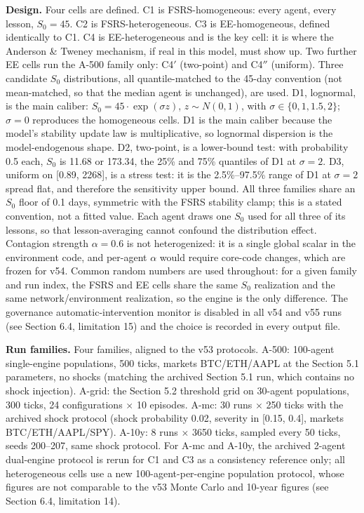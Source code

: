 \documentclass[11pt]{article}
\begin{document}
\textbf{Design.} Four cells are defined. C1 is FSRS-homogeneous: every agent, every lesson, $S_0 = 45$. C2 is FSRS-heterogeneous. C3 is EE-homogeneous, defined identically to C1. C4 is EE-heterogeneous and is the key cell: it is where the Anderson \& Tweney mechanism, if real in this model, must show up. Two further EE cells run the A-500 family only: C4$'$ (two-point) and C4$''$ (uniform). Three candidate $S_0$ distributions, all quantile-matched to the 45-day convention (not mean-matched, so that the median agent is unchanged), are used. D1, lognormal, is the main caliber: $S_0 = 45 \cdot \exp(\sigma z)$, $z \sim N(0,1)$, with $\sigma \in \{0, 1, 1.5, 2\}$; $\sigma = 0$ reproduces the homogeneous cells. D1 is the main caliber because the model's stability update law is multiplicative, so lognormal dispersion is the model-endogenous shape. D2, two-point, is a lower-bound test: with probability 0.5 each, $S_0$ is 11.68 or 173.34, the 25\% and 75\% quantiles of D1 at $\sigma = 2$. D3, uniform on [0.89, 2268], is a stress test: it is the 2.5\%--97.5\% range of D1 at $\sigma = 2$ spread flat, and therefore the sensitivity upper bound. All three families share an $S_0$ floor of 0.1 days, symmetric with the FSRS stability clamp; this is a stated convention, not a fitted value. Each agent draws one $S_0$ used for all three of its lessons, so that lesson-averaging cannot confound the distribution effect. Contagion strength $\alpha = 0.6$ is not heterogenized: it is a single global scalar in the environment code, and per-agent $\alpha$ would require core-code changes, which are frozen for v54. Common random numbers are used throughout: for a given family and run index, the FSRS and EE cells share the same $S_0$ realization and the same network/environment realization, so the engine is the only difference. The governance automatic-intervention monitor is disabled in all v54 and v55 runs (see Section 6.4, limitation 15) and the choice is recorded in every output file.

\textbf{Run families.} Four families, aligned to the v53 protocols. A-500: 100-agent single-engine populations, 500 ticks, markets BTC/ETH/AAPL at the Section 5.1 parameters, no shocks (matching the archived Section 5.1 run, which contains no shock injection). A-grid: the Section 5.2 threshold grid on 30-agent populations, 300 ticks, 24 configurations $\times$ 10 episodes. A-mc: 30 runs $\times$ 250 ticks with the archived shock protocol (shock probability 0.02, severity in [0.15, 0.4], markets BTC/ETH/AAPL/SPY). A-10y: 8 runs $\times$ 3650 ticks, sampled every 50 ticks, seeds 200--207, same shock protocol. For A-mc and A-10y, the archived 2-agent dual-engine protocol is rerun for C1 and C3 as a consistency reference only; all heterogeneous cells use a new 100-agent-per-engine population protocol, whose figures are not comparable to the v53 Monte Carlo and 10-year figures (see Section 6.4, limitation 14).
\end{document}
